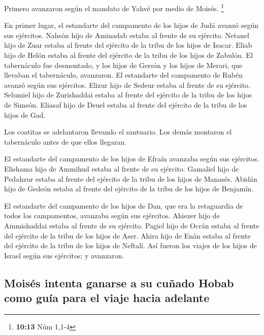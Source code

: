 Primero avanzaron según el mandato de Yahvé por medio de
Moisés. \footnote{\textbf{10:13} Núm 1,1-4}

 En primer lugar, el estandarte del campamento de los
hijos de Judá avanzó según sus ejércitos. Nahsón hijo de Aminadab estaba
al frente de su ejército.  Netanel hijo de Zuar estaba al
frente del ejército de la tribu de los hijos de Isacar. 
Eliab hijo de Helón estaba al frente del ejército de la tribu de los
hijos de Zabulón.  El tabernáculo fue desmontado, y los
hijos de Gersón y los hijos de Merari, que llevaban el tabernáculo,
avanzaron.  El estandarte del campamento de Rubén avanzó
según sus ejércitos. Elizur hijo de Sedeur estaba al frente de su
ejército.  Selumiel hijo de Zurishaddai estaba al frente
del ejército de la tribu de los hijos de Simeón.  Eliasaf
hijo de Deuel estaba al frente del ejército de la tribu de los hijos de
Gad.

 Los coatitas se adelantaron llevando el santuario. Los
demás montaron el tabernáculo antes de que ellos llegaran.

 El estandarte del campamento de los hijos de Efraín
avanzaba según sus ejércitos. Elishama hijo de Ammihud estaba al frente
de su ejército.  Gamaliel hijo de Pedahzur estaba al
frente del ejército de la tribu de los hijos de Manasés. 
Abidán hijo de Gedeón estaba al frente del ejército de la tribu de los
hijos de Benjamín.

 El estandarte del campamento de los hijos de Dan, que
era la retaguardia de todos los campamentos, avanzaba según sus
ejércitos. Ahiezer hijo de Ammishaddai estaba al frente de su ejército.
 Pagiel hijo de Ocrán estaba al frente del ejército de la
tribu de los hijos de Aser.  Ahira hijo de Enán estaba al
frente del ejército de la tribu de los hijos de Neftalí. 
Así fueron los viajes de los hijos de Israel según sus ejércitos; y
avanzaron.

\hypertarget{moisuxe9s-intenta-ganarse-a-su-cuuxf1ado-hobab-como-guuxeda-para-el-viaje-hacia-adelante}{%
\subsection{Moisés intenta ganarse a su cuñado Hobab como guía para el
viaje hacia
adelante}\label{moisuxe9s-intenta-ganarse-a-su-cuuxf1ado-hobab-como-guuxeda-para-el-viaje-hacia-adelante}}

